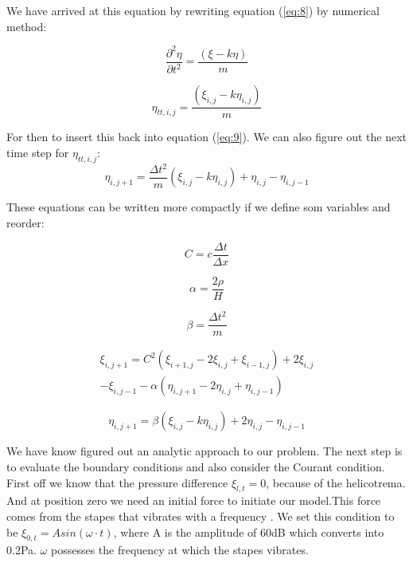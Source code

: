 \documentclass[twoside,twocolumn]{article}
\begin{document}
We have arrived at this equation by rewriting equation (\ref{eq:8}) by numerical method: 

\begin{equation}
\frac{\partial^2\eta}{\partial t^2}  = \frac{ \left(\xi -  k\eta \right)}{m}
\end{equation}

\begin{equation}
\eta_{tt,i,j} = \frac{ \left(\xi_{i,j} -  k\eta_{i,j} \right)}{m}
\end{equation}

For then to insert this back into equation (\ref{eq:9}). We can also figure out the next time step for $\eta_{tt,i,j}$: 
\begin{equation}
\eta_{i,j + 1} = \frac{\Delta t^2}{m}\left(\xi_{i,j} - k\eta_{i,j}\right) + \eta_{i,j} - \eta_{i,j-1}
\end{equation}

These equations can be written more compactly if we define som variables and reorder: 

\begin{equation}
C =  c\frac{\Delta t}{\Delta x}
\end{equation}

\begin{equation}
\alpha = \frac{2\rho}{H}
\end{equation}

\begin{equation}
\beta =  \frac{\Delta t^2}{m}
\end{equation}

\begin{multline*}
\xi_{i,j+1} =C^2\left(\xi_{i+1,j} -2\xi_{i,j} + \xi_{i-1,j}\right) + 2\xi_{i,j} \\
-\xi_{i,j-1} - \alpha\left(\eta_{i,j+1} -2\eta_{i,j} + \eta_{i,j-1}\right)
\end{multline*}

\begin{equation}
\eta_{i,j + 1} = \beta \left( \xi_{i,j}- k\eta_{i,j}\right) + 2\eta_{i,j} - \eta_{i,j-1}
\end{equation}


We have know figured out an analytic approach to our problem. The next step is to evaluate the boundary conditions and also consider the Courant condition. First off we know that the pressure difference $\xi_{l, t} = 0$, because of the helicotrema. And at position zero we need an initial force to initiate our model.This force comes from the stapes that vibrates with a frequency \cite{Robles2001}. We set this condition to be $ \xi_{0, t} = Asin(\omega \cdot t)$, where A is the amplitude of 60dB which converts into 0.2Pa. $\omega$  possesses the frequency at which the stapes vibrates.
\end{document}
